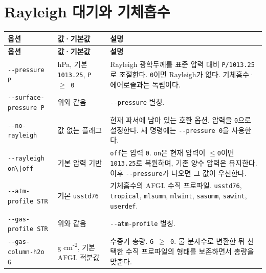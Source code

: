 

\section{Rayleigh 대기와 기체흡수}
\label{sec:auto:03_options:3}



{\TableFont
\begin{longtable}{@{}>{\raggedright\arraybackslash}p{}>{\raggedright\arraybackslash}p{}>{\raggedright\arraybackslash}p{}@{}}
\toprule
\textbf{옵션} & \textbf{값·기본값} & \textbf{설명} \\
\midrule
\endfirsthead
\toprule
\textbf{옵션} & \textbf{값·기본값} & \textbf{설명} \\
\midrule
\endhead
\bottomrule
\endfoot
\texttt{-\allowbreak{}-\allowbreak{}pressure P} & hPa, 기본 \texttt{1013.\allowbreak{}25}, \texttt{P \ensuremath{\geq} 0} & Rayleigh 광학두께를 표준 압력 대비 \texttt{P/\allowbreak{}1013.\allowbreak{}25}로 조절한다. \texttt{0}이면 Rayleigh가 없다. 기체흡수·에어로졸과는 독립이다. \\
\texttt{-\allowbreak{}-\allowbreak{}surface-\allowbreak{}pressure P} & 위와 같음 & \texttt{-\allowbreak{}-\allowbreak{}pressure} 별칭. \\
\texttt{-\allowbreak{}-\allowbreak{}no-\allowbreak{}rayleigh} & 값 없는 플래그 & 현재 파서에 남아 있는 호환 옵션. 압력을 \texttt{0}으로 설정한다. 새 명령에는 \texttt{-\allowbreak{}-\allowbreak{}pressure 0}을 사용한다. \\
\texttt{-\allowbreak{}-\allowbreak{}rayleigh on\textbackslash{}|off\allowbreak{}} & 기본 압력 기반 & \texttt{off}는 압력 \texttt{0}. \texttt{on}은 현재 압력이 \texttt{\ensuremath{\leq}0}이면 \texttt{1013.\allowbreak{}25}로 복원하며, 기존 양수 압력은 유지한다. 이후 \texttt{-\allowbreak{}-\allowbreak{}pressure}가 나오면 그 값이 우선한다. \\
\texttt{-\allowbreak{}-\allowbreak{}atm-\allowbreak{}profile STR} & 기본 \texttt{usstd76} & 기체흡수의 AFGL 수직 프로파일. \texttt{usstd76}, \texttt{tropical}, \texttt{mlsumm}, \texttt{mlwint}, \texttt{sasumm}, \texttt{sawint}, \texttt{userdef}. \\
\texttt{-\allowbreak{}-\allowbreak{}gas-\allowbreak{}profile STR} & 위와 같음 & \texttt{-\allowbreak{}-\allowbreak{}atm-\allowbreak{}profile} 별칭. \\
\texttt{-\allowbreak{}-\allowbreak{}gas-\allowbreak{}column-\allowbreak{}h2o G} & g cm\textsuperscript{-}\textsuperscript{2}, 기본 AFGL 적분값 & 수증기 총량. \texttt{G \ensuremath{\geq} 0}. 물 분자수로 변환한 뒤 선택한 수직 프로파일의 형태를 보존하면서 총량을 맞춘다. \\

\end{longtable}}
